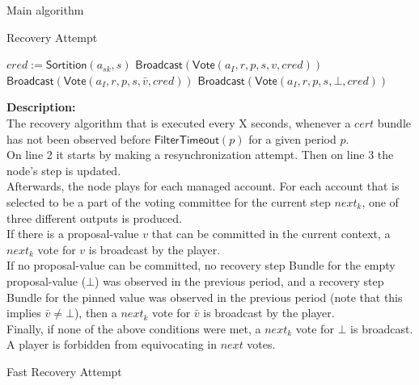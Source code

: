 \documentclass[10pt,a4paper]{article}
\begin{document}
\begin{section}{Main algorithm}
\begin{subsection}{Recovery Attempt}
\begin{algorithm}[H]
\begin{algorithmic}[1]
            \State $cred := 
            \mathsf{\mathsf{Sortition}}(a_{sk}, s)$
                    \State $\mathsf{Broadcast}(\mathsf{Vote}(a_I, r, p, s, v, cred))$
                    \State $\mathsf{Broadcast}(\mathsf{Vote}(a_I, r, p, s, \bar{v}, cred))$
                \Else
                    \State $\mathsf{Broadcast}(\mathsf{Vote}(a_I, r, p, s, \bot, cred))$
                \EndIf
            \EndIf
        \EndFor
        \EndFunction
        \end{algorithmic}
    \end{algorithm}
    
    
    \noindent \textbf{Description:}\\
The recovery algorithm that is executed every X seconds, 
whenever a $cert$ bundle has not been observed before $\mathsf{FilterTimeout}(p)$ for a given period $p$. \\
On line 2 it starts by making a resynchronization attempt. Then on line 3 the node's step is updated.\\
Afterwards, the node plays for each managed account. For each account that is selected to be a part of the voting committee for the current
step $next_k$, one of three different outputs is produced. \\
If there is a proposal-value $v$ that can be committed in the current context, a $next_k$ vote for $v$ is broadcast by the player. \\
If no proposal-value can be committed, no recovery step Bundle for the empty proposal-value ($\bot$) was observed in the 
previous period, and a recovery step Bundle for the pinned value was observed in the previous period (note that this implies $\bar{v} \neq \bot$),
then a $next_k$ vote for $\bar{v}$ is broadcast by the player. \\
Finally, if none of the above conditions were met, a $next_k$ vote for $\bot$ is broadcast. A player is forbidden
from equivocating in $next$ votes.

\end{subsection}


\begin{subsection}{Fast Recovery Attempt}\label{ssect:FastRecovery}


\end{subsection}
\end{section}
\end{document}
